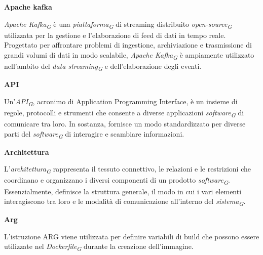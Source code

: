 \documentclass{article}
\begin{document}
\vspace{0.4cm}

\textbf{Apache kafka}

\vspace{0.1cm}

\textit{Apache Kafka}\textsubscript{\textit{G}} è una \textit{piattaforma}\textsubscript{\textit{G}} di streaming distribuito \textit{open-source}\textsubscript{\textit{G}} utilizzata per la gestione e l'elaborazione di feed di dati in tempo reale. Progettato per affrontare problemi di ingestione, archiviazione e trasmissione di grandi volumi di dati in modo scalabile, \textit{Apache Kafka}\textsubscript{\textit{G}} è ampiamente utilizzato nell'ambito del \textit{data streaming}\textsubscript{\textit{G}} e dell'elaborazione degli eventi.

\vspace{0.4cm}

\textbf{API}

\vspace{0.1cm}

Un'\textit{API}\textsubscript{\textit{G}}, acronimo di Application Programming Interface, è un insieme di regole, protocolli e strumenti che consente a diverse applicazioni \textit{software}\textsubscript{\textit{G}} di comunicare tra loro. In sostanza, fornisce un modo standardizzato per diverse parti del \textit{software}\textsubscript{\textit{G}} di interagire e scambiare informazioni.

\vspace{0.4cm}

\textbf{Architettura}

\vspace{0.1cm}

L'\textit{architettura}\textsubscript{\textit{G}} rappresenta il tessuto connettivo, le relazioni e le restrizioni che coordinano e organizzano i diversi componenti di un prodotto \textit{software}\textsubscript{\textit{G}}. Essenzialmente, definisce la struttura generale, il modo in cui i vari elementi interagiscono tra loro e le modalità di comunicazione all'interno del \textit{sistema}\textsubscript{\textit{G}}.

\pagebreak

\textbf{Arg}

\vspace{0.1cm}

L’istruzione ARG viene utilizzata per definire variabili di build che possono essere utilizzate nel \textit{Dockerfile}\textsubscript{\textit{G}} durante la creazione dell'immagine. 
\end{document}
